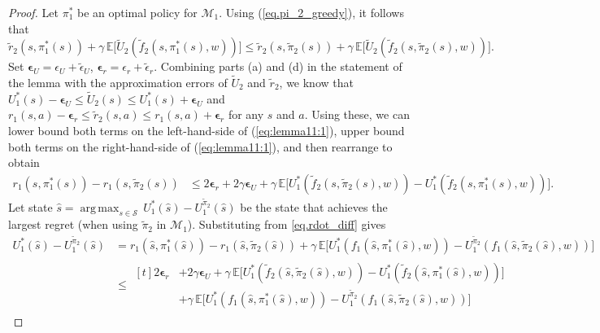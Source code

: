\documentclass[11pt, notitlepage]{article}
\DeclareMathOperator*{\argmax}{arg\,max}
\newcommand{\E}{\mathbb{E}}
\newcommand{\1}{\mathbbm{1}}
\begin{document}
\begin{proof}
    Let $\pi_1^*$ be an optimal policy for $\mathcal M_1$. Using (\ref{eq.pi_2_greedy}), it follows that
    \begin{equation}
        \tilde{r}_2(s,\pi_1^*(s)) + \gamma \, \E \bigl [\tilde{U}_2(\tilde{f}_2(s,\pi_1^*(s),w)) \bigr]
        \leq \tilde{r}_2(s,\tilde{\pi}_2(s)) + \gamma \, \E \bigl [\tilde{U}_2(\tilde{f}_2(s,\tilde{\pi}_2(s),w) ) \bigr].
    \label{eq:lemma11:1}
    \end{equation}
    Set $\boldsymbol{\epsilon}_U = \epsilon_U + \tilde{\epsilon}_U$, $\boldsymbol{\epsilon}_r = \epsilon_r + \tilde{\epsilon}_r$. Combining parts (a) and (d) in the statement of the lemma with the approximation errors of $\tilde{U}_2$ and $\tilde{r}_2$, we know that $U_1^*(s) - \boldsymbol{\epsilon}_U \leq \tilde{U}_2(s) \leq U_1^*(s) +\boldsymbol{\epsilon}_U$ and $r_1(s,a) - \boldsymbol{\epsilon}_r \leq \tilde{r}_2(s,a) \leq r_1(s,a) + \boldsymbol{\epsilon}_r$ for any $s$ and $a$. Using these, we can lower bound both terms on the left-hand-side of (\ref{eq:lemma11:1}), upper bound both terms on the right-hand-side of (\ref{eq:lemma11:1}), and then rearrange to obtain
    \begin{align} 
        r_1(s,\pi_1^*(s)) - r_1(s,\tilde{\pi}_2(s))
        &\leq 2\boldsymbol{\epsilon}_r + 2\gamma\boldsymbol{\epsilon}_U + \gamma\, \E \bigl [ U_1^*(\tilde{f}_2(s,\tilde{\pi}_2(s),w)) - U_1^*(\tilde{f}_2(s,\pi_1^*(s),w)) \bigr ].\label{eq.rdot_diff}
    \end{align}
    Let state $\hat{s} = \argmax_{s\in\mathcal{S}} \, U_1^*(\hat{s}) - U_1^{\tilde{\pi}_2}(\hat{s}) $ be the state that achieves the largest regret (when using $\tilde{\pi}_2$ in $\mathcal M_1$). Substituting from \eqref{eq.rdot_diff} gives
    \begin{equation*}
        \begin{aligned}
        U_1^*(\hat{s}) - U_1^{\tilde{\pi}_2}(\hat{s})
        &= r_1(\hat{s},\pi_1^*(\hat{s})) - r_1(\hat{s},\tilde{\pi}_2(\hat{s})) + \gamma \, \E \bigl[ U_1^*(f_1(\hat{s},\pi_1^*(\hat{s}),w)) - U_1^{\tilde{\pi}_2}(f_1(\hat{s},\tilde{\pi}_2(\hat{s}),w)) \bigr]\\
        &\leq \begin{aligned}[t] 2\boldsymbol{\epsilon}_r &+ 2\gamma \boldsymbol{\epsilon}_U + \gamma\, \E \bigl [ U_1^*(\tilde{f}_2(\hat{s},\tilde{\pi}_2(\hat{s}),w)) - U_1^*(\tilde{f}_2(\hat{s},\pi_1^*(\hat{s}),w)) \bigr ]\\
        &+ \gamma \, \E \bigl[ U_1^*(f_1(\hat{s},\pi_1^*(\hat{s}),w)) - U_1^{\tilde{\pi}_2}(f_1(\hat{s},\tilde{\pi}_2(\hat{s}),w)) \bigr]

\end{aligned}
\end{aligned}
\end{equation*}
\end{proof}
\end{document}

